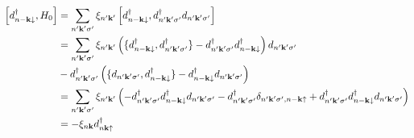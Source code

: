 \begin{align}
    \left[ d_{n -\bm{\mathrm{k}} \downarrow}^{\dagger}, H_0 \right]
    &= \sum_{n^{\prime} \bm{\mathrm{k}}^{\prime} \sigma^{\prime}} \xi_{n^{\prime} \bm{\mathrm{k}}^{\prime}} \left[ d_{n -\bm{\mathrm{k}} \downarrow}^{\dagger}, d_{n^{\prime} \bm{\mathrm{k}}^{\prime} \sigma^{\prime}}^{\dagger} d_{n^{\prime} \bm{\mathrm{k}}^{\prime} \sigma^{\prime}} \right] \\
    &= \sum_{n^{\prime} \bm{\mathrm{k}}^{\prime} \sigma^{\prime}} \xi_{n^{\prime} \bm{\mathrm{k}}^{\prime}}
    \left(
        \{d_{n -\bm{\mathrm{k}} \downarrow}^{\dagger}, d_{n^{\prime} \bm{\mathrm{k}}^{\prime} \sigma^{\prime}}^{\dagger} \} - d_{n^{\prime} \bm{\mathrm{k}}^{\prime} \sigma^{\prime}}^{\dagger} d_{n -\bm{\mathrm{k}} \downarrow}^{\dagger}
    \right) d_{n^{\prime} \bm{\mathrm{k}}^{\prime} \sigma^{\prime}} \\
    &- d_{n^{\prime} \bm{\mathrm{k}}^{\prime} \sigma^{\prime}}^{\dagger}
    \left(
        \{ d_{n^{\prime} \bm{\mathrm{k}}^{\prime} \sigma^{\prime}}, d_{n -\bm{\mathrm{k}} \downarrow}^{\dagger} \} - d_{n -\bm{\mathrm{k}} \downarrow}^{\dagger} d_{n^{\prime} \bm{\mathrm{k}}^{\prime} \sigma^{\prime}}
    \right) \\
    &= \sum_{n^{\prime} \bm{\mathrm{k}}^{\prime} \sigma^{\prime}} \xi_{n^{\prime} \bm{\mathrm{k}}^{\prime}}
    \left(- d_{n^{\prime} \bm{\mathrm{k}}^{\prime} \sigma^{\prime}}^{\dagger} d_{n -\bm{\mathrm{k}} \downarrow}^{\dagger} d_{n^{\prime} \bm{\mathrm{k}}^{\prime} \sigma^{\prime}}
    - d_{n^{\prime} \bm{\mathrm{k}}^{\prime} \sigma^{\prime}}^{\dagger}
    \delta_{n^{\prime} \bm{\mathrm{k}}^{\prime} \sigma^{\prime}, n -\bm{\mathrm{k}} \uparrow}
    + d_{n^{\prime} \bm{\mathrm{k}}^{\prime} \sigma^{\prime}}^{\dagger} d_{n -\bm{\mathrm{k}} \downarrow}^{\dagger} d_{n^{\prime} \bm{\mathrm{k}}^{\prime} \sigma^{\prime}} \right) \\
    &= - \xi_{n \bm{\mathrm{k}}} d_{n \bm{\mathrm{k}} \uparrow}^{\dagger}
\end{align}

